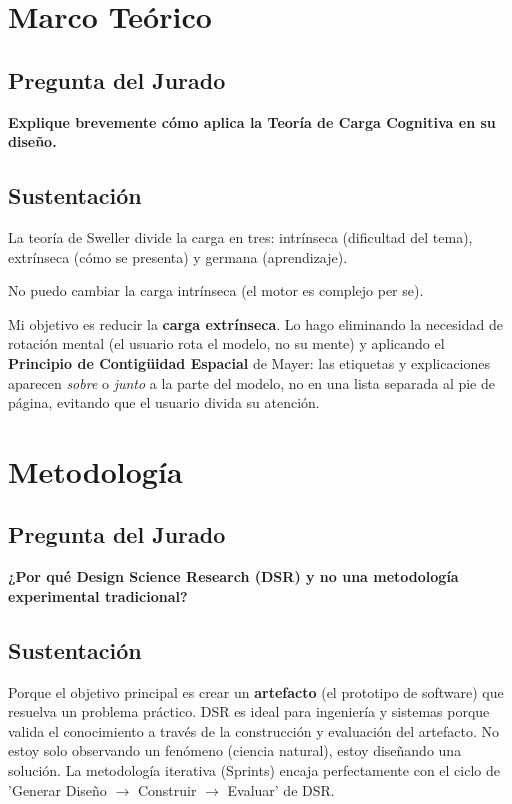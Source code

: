 \documentclass[11pt]{article}
\begin{document}
\section{Marco Teórico}

\subsection*{Pregunta del Jurado}
\textbf{Explique brevemente cómo aplica la Teoría de Carga Cognitiva en su diseño.}

\subsection*{Sustentación}
La teoría de Sweller divide la carga en tres: intrínseca (dificultad del tema), extrínseca (cómo se presenta) y germana (aprendizaje).

No puedo cambiar la carga intrínseca (el motor es complejo per se).

Mi objetivo es reducir la \textbf{carga extrínseca}. Lo hago eliminando la necesidad de rotación mental (el usuario rota el modelo, no su mente) y aplicando el \textbf{Principio de Contigüidad Espacial} de Mayer: las etiquetas y explicaciones aparecen \textit{sobre} o \textit{junto} a la parte del modelo, no en una lista separada al pie de página, evitando que el usuario divida su atención.

\section{Metodología}

\subsection*{Pregunta del Jurado}
\textbf{¿Por qué Design Science Research (DSR) y no una metodología experimental tradicional?}

\subsection*{Sustentación}
Porque el objetivo principal es crear un \textbf{artefacto} (el prototipo de software) que resuelva un problema práctico. DSR es ideal para ingeniería y sistemas porque valida el conocimiento a través de la construcción y evaluación del artefacto. No estoy solo observando un fenómeno (ciencia natural), estoy diseñando una solución. La metodología iterativa (Sprints) encaja perfectamente con el ciclo de 'Generar Diseño $\rightarrow$ Construir $\rightarrow$ Evaluar' de DSR.
\end{document}
